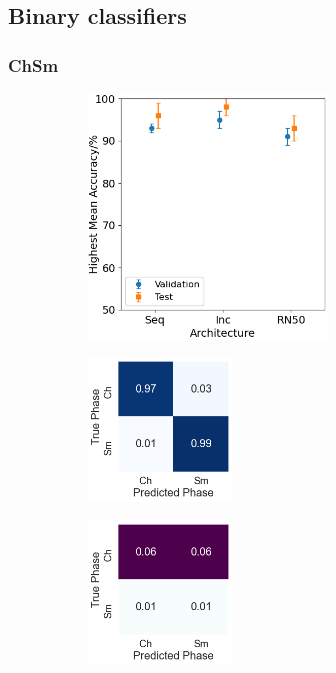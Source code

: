 \documentclass[12pt]{article}
\begin{document}
\subsection{Binary classifiers}
\subsubsection{ChSm}
\begin{figure}[!h]
\centering
\begin{subfigure}{0.4\textwidth}
	\centering
	\includegraphics[width=2.5in]{images/Graphs/ChSm.png}
	\caption{}
	\label{chsm:graph}
\end{subfigure}%
\begin{subfigure}{0.25\textwidth}
	\centering
	\includegraphics[width=1.5in]{images/ConMats/ChSm_mean.png}
	\caption{}
	\label{chsm:mean}
\end{subfigure}%
\begin{subfigure}{0.25\textwidth}
	\centering
	\includegraphics[width=1.5in]{images/ConMats/ChSm_std.png}
	\caption{}
	\label{chsm:std}
\end{subfigure}%
\caption{}
\label{chsm:chsm}
\end{figure}
\end{document}
